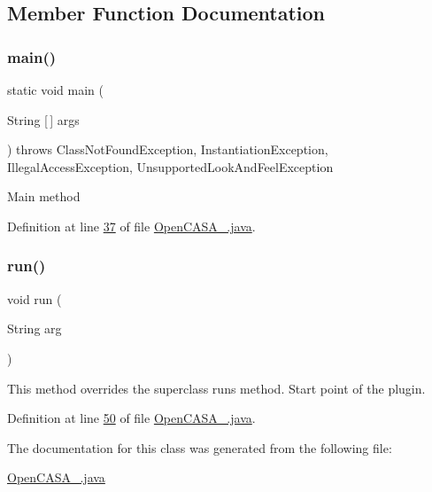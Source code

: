 \subsection{Member Function Documentation}
\hypertarget{class_open_c_a_s_a___a8b260eecbaabcef8473fd87ada040682}{}\label{class_open_c_a_s_a___a8b260eecbaabcef8473fd87ada040682} 
\subsubsection{\texorpdfstring{main()}{main()}}
{\footnotesize\ttfamily static void main (\begin{DoxyParamCaption}\item[{String \mbox{[}$\,$\mbox{]}}]{args }\end{DoxyParamCaption}) throws Class\+Not\+Found\+Exception, Instantiation\+Exception, Illegal\+Access\+Exception, Unsupported\+Look\+And\+Feel\+Exception\hspace{0.3cm}{\ttfamily [static]}}

Main method 

Definition at line \hyperlink{_open_c_a_s_a___8java_source_l00037}{37} of file \hyperlink{_open_c_a_s_a___8java_source}{Open\+C\+A\+S\+A\+\_\+.\+java}.

\hypertarget{class_open_c_a_s_a___a4d9c6a01d97384c0df54710b80fc88fc}{}\label{class_open_c_a_s_a___a4d9c6a01d97384c0df54710b80fc88fc} 
\subsubsection{\texorpdfstring{run()}{run()}}
{\footnotesize\ttfamily void run (\begin{DoxyParamCaption}\item[{String}]{arg }\end{DoxyParamCaption})}

This method overrides the superclass run\textquotesingle{}s method. Start point of the plugin. 

Definition at line \hyperlink{_open_c_a_s_a___8java_source_l00050}{50} of file \hyperlink{_open_c_a_s_a___8java_source}{Open\+C\+A\+S\+A\+\_\+.\+java}.



The documentation for this class was generated from the following file\+:\begin{DoxyCompactItemize}
\item 
\hyperlink{_open_c_a_s_a___8java}{Open\+C\+A\+S\+A\+\_\+.\+java}\end{DoxyCompactItemize}
